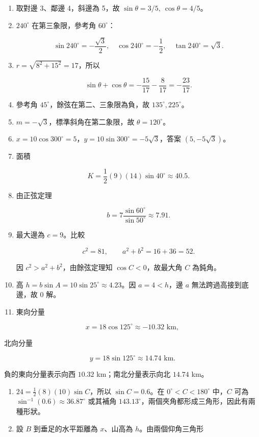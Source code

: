\documentclass[11pt,a4paper]{article}
\begin{document}
\begin{enumerate}
\def\labelenumi{\arabic{enumi}.}
\item
  取對邊 3、鄰邊 4，斜邊為 5，故 \(\boxed{\sin\theta=3/5,\ \cos\theta=4/5}\)。
\item
  \(240^\circ\) 在第三象限，參考角 \(60^\circ\)：

  \[
  \boxed{\sin240^\circ=-\frac{\sqrt3}{2}},\quad
  \boxed{\cos240^\circ=-\frac12},\quad
  \boxed{\tan240^\circ=\sqrt3}.
  \]
\item
  \(r=\sqrt{8^2+15^2}=17\)，所以

  \[
  \sin\theta+\cos\theta=-\frac{15}{17}-\frac8{17}=\boxed{-\frac{23}{17}}.
  \]
\item
  參考角 \(45^\circ\)，餘弦在第二、三象限為負，故 \(\boxed{135^\circ,225^\circ}\)。
\item
  \(m=-\sqrt3\)，標準斜角在第二象限，故 \(\boxed{\theta=120^\circ}\)。
\item
  \(x=10\cos300^\circ=5\)，\(y=10\sin300^\circ=-5\sqrt3\)，答案 \(\boxed{(5,-5\sqrt3)}\)。
\item
  面積

  \[
  K=\frac12(9)(14)\sin40^\circ\approx\boxed{40.5}.
  \]
\item
  由正弦定理

  \[
  b=7\frac{\sin60^\circ}{\sin50^\circ}\approx\boxed{7.91}.
  \]
\item
  最大邊為 \(c=9\)。比較

  \[
  c^2=81,\qquad a^2+b^2=16+36=52.
  \]

  因 \(c^2>a^2+b^2\)，由餘弦定理知 \(\cos C<0\)，故最大角 \(C\) 為鈍角。
\item
  高 \(h=b\sin A=10\sin25^\circ\approx4.23\)。因 \(a=4<h\)，邊 \(a\) 無法跨過高接到底邊，故 \(\boxed{0\text{ 解}}\)。
\item
  東向分量
\end{enumerate}

\[
   x=18\cos125^\circ\approx-10.32\text{ km},
   \]

北向分量

\[
   y=18\sin125^\circ\approx14.74\text{ km}.
   \]

負的東向分量表示向西 \(10.32\) km；南北分量表示向北 \(14.74\) km。

\begin{enumerate}
\def\labelenumi{\arabic{enumi}.}
\setcounter{enumi}{11}
\item
  \(24=\frac12(8)(10)\sin C\)，所以 \(\boxed{\sin C=0.6}\)。在 \(0^\circ<C<180^\circ\) 中，\(C\) 可為 \(\sin^{-1}(0.6)\approx36.87^\circ\) 或其補角 \(143.13^\circ\)，兩個夾角都形成三角形，因此有兩種形狀。
\item
  設 \(B\) 到垂足的水平距離為 \(x\)、山高為 \(h\)。由兩個仰角三角形
\end{enumerate}
\end{document}
